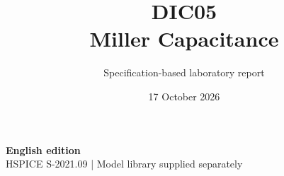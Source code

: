\documentclass[11pt,a4paper]{article}
\title{\color{accent}DIC05\\[4pt]Miller Capacitance}
\author{Specification-based laboratory report}
\date{17 October 2026}
\begin{document}
\maketitle
\begin{center}\small\textbf{English edition}\\
HSPICE S-2021.09 \quad | \quad Model library supplied separately
\end{center}


\end{document}
